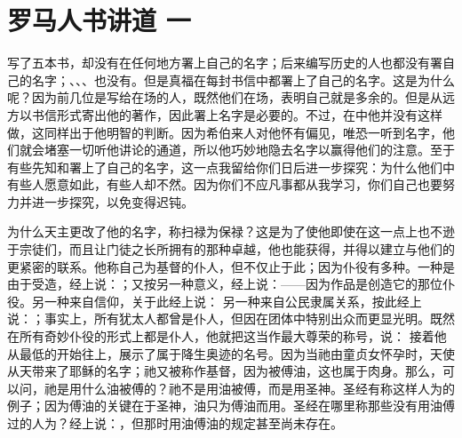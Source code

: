 
\section{罗马人书讲道 一}

\par

\par

写了五本书，却没有在任何地方署上自己的名字；后来编写历史的人也都没有署自己的名字；、、、也没有。但是真福在每封书信中都署上了自己的名字。这是为什么呢？因为前几位是写给在场的人，既然他们在场，表明自己就是多余的。但是从远方以书信形式寄出他的著作，因此署上名字是必要的。不过，在中他并没有这样做，这同样出于他明智的判断。因为希伯来人对他怀有偏见，唯恐一听到名字，他们就会堵塞一切听他讲论的通道，所以他巧妙地隐去名字以赢得他们的注意。至于有些先知和署上了自己的名字，这一点我留给你们日后进一步探究：为什么他们中有些人愿意如此，有些人却不然。因为你们不应凡事都从我学习，你们自己也要努力并进一步探究，以免变得迟钝。\par

 为什么天主更改了他的名字，称扫禄为保禄？这是为了使他即使在这一点上也不逊于宗徒们，而且让门徒之长所拥有的那种卓越，他也能获得，并得以建立与他们的更紧密的联系。他称自己为基督的仆人，但不仅止于此；因为仆役有多种。一种是由于受造，经上说：；又按另一种意义，经上说：——因为作品是创造它的那位仆役。另一种来自信仰，关于此经上说： 另一种来自公民隶属关系，按此经上说：；事实上，所有犹太人都曾是仆人，但因在团体中特别出众而更显光明。既然在所有奇妙仆役的形式上都是仆人，他就把这当作最大尊荣的称号，说： 接着他从最低的开始往上，展示了属于降生奥迹的名号。因为当祂由童贞女怀孕时，天使从天带来了耶稣的名字；祂又被称作基督，因为被傅油，这也属于肉身。那么，可以问，祂是用什么油被傅的？祂不是用油被傅，而是用圣神。圣经有称这样人为的例子；因为傅油的关键在于圣神，油只为傅油而用。圣经在哪里称那些没有用油傅过的人为？经上说：，但那时用油傅油的规定甚至尚未存在。\par

